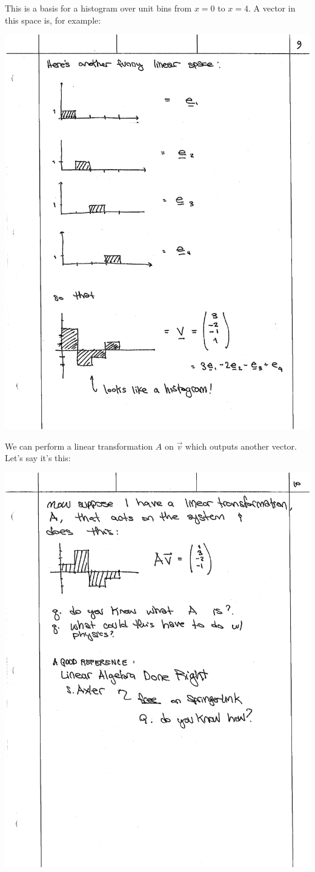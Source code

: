 \documentclass[
  11pt,
	colorful,
	raggedright,
]{tufte-style-thesis-flip}
\begin{document}
\noindent This is a basis for a histogram over unit bins from $x=0$ to $x=4$. A vector in this space is, for example:

\begin{center}
\includegraphics[width=.8\textwidth]{figures/lec02_hist.pdf}
\end{center}

\noindent We can perform a linear transformation $A$ on $\vec{v}$ which outputs another vector. Let’s say it’s this:


\begin{center}
\includegraphics[width=.8\textwidth]{figures/lec02_hist2.pdf}
\end{center}
\end{document}
